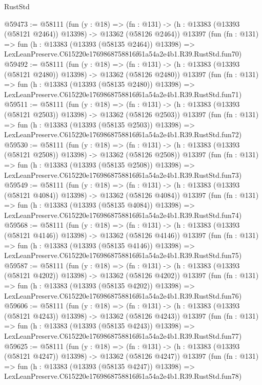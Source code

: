 \begin{lexlean}{RustStd}
\begin{coremodule}
@59473 := @58111
    (fun (y : @18) =>
    (fn : @131) -> (h : @13383 (@13393 (@58121 @2464)) @13398) -> @13362 (@58126 @2464))
    @13397
    (fun (fn : @131) =>
    fun (h : @13383 (@13393 (@58135 @2464)) @13398) =>
    LexLeanPreserve.C615220e1769868758816f61a54a2e4b1.R39.RustStd.fun70)
@59492 := @58111
    (fun (y : @18) =>
    (fn : @131) -> (h : @13383 (@13393 (@58121 @2480)) @13398) -> @13362 (@58126 @2480))
    @13397
    (fun (fn : @131) =>
    fun (h : @13383 (@13393 (@58135 @2480)) @13398) =>
    LexLeanPreserve.C615220e1769868758816f61a54a2e4b1.R39.RustStd.fun71)
@59511 := @58111
    (fun (y : @18) =>
    (fn : @131) -> (h : @13383 (@13393 (@58121 @2503)) @13398) -> @13362 (@58126 @2503))
    @13397
    (fun (fn : @131) =>
    fun (h : @13383 (@13393 (@58135 @2503)) @13398) =>
    LexLeanPreserve.C615220e1769868758816f61a54a2e4b1.R39.RustStd.fun72)
@59530 := @58111
    (fun (y : @18) =>
    (fn : @131) -> (h : @13383 (@13393 (@58121 @2508)) @13398) -> @13362 (@58126 @2508))
    @13397
    (fun (fn : @131) =>
    fun (h : @13383 (@13393 (@58135 @2508)) @13398) =>
    LexLeanPreserve.C615220e1769868758816f61a54a2e4b1.R39.RustStd.fun73)
@59549 := @58111
    (fun (y : @18) =>
    (fn : @131) -> (h : @13383 (@13393 (@58121 @4084)) @13398) -> @13362 (@58126 @4084))
    @13397
    (fun (fn : @131) =>
    fun (h : @13383 (@13393 (@58135 @4084)) @13398) =>
    LexLeanPreserve.C615220e1769868758816f61a54a2e4b1.R39.RustStd.fun74)
@59568 := @58111
    (fun (y : @18) =>
    (fn : @131) -> (h : @13383 (@13393 (@58121 @4146)) @13398) -> @13362 (@58126 @4146))
    @13397
    (fun (fn : @131) =>
    fun (h : @13383 (@13393 (@58135 @4146)) @13398) =>
    LexLeanPreserve.C615220e1769868758816f61a54a2e4b1.R39.RustStd.fun75)
@59587 := @58111
    (fun (y : @18) =>
    (fn : @131) -> (h : @13383 (@13393 (@58121 @4202)) @13398) -> @13362 (@58126 @4202))
    @13397
    (fun (fn : @131) =>
    fun (h : @13383 (@13393 (@58135 @4202)) @13398) =>
    LexLeanPreserve.C615220e1769868758816f61a54a2e4b1.R39.RustStd.fun76)
@59606 := @58111
    (fun (y : @18) =>
    (fn : @131) -> (h : @13383 (@13393 (@58121 @4243)) @13398) -> @13362 (@58126 @4243))
    @13397
    (fun (fn : @131) =>
    fun (h : @13383 (@13393 (@58135 @4243)) @13398) =>
    LexLeanPreserve.C615220e1769868758816f61a54a2e4b1.R39.RustStd.fun77)
@59625 := @58111
    (fun (y : @18) =>
    (fn : @131) -> (h : @13383 (@13393 (@58121 @4247)) @13398) -> @13362 (@58126 @4247))
    @13397
    (fun (fn : @131) =>
    fun (h : @13383 (@13393 (@58135 @4247)) @13398) =>
    LexLeanPreserve.C615220e1769868758816f61a54a2e4b1.R39.RustStd.fun78)

\end{coremodule}
\end{lexlean}
